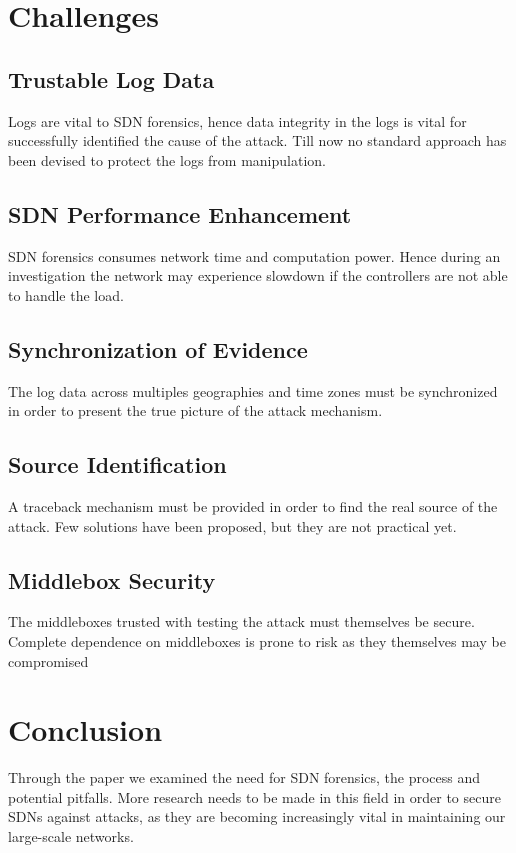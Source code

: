 \documentclass{article}
\begin{document}
\section{Challenges}

\subsection{Trustable Log Data}

Logs are vital to SDN forensics, hence data integrity in the logs is vital for successfully identified the cause of the attack. Till now no standard approach has been devised to protect the logs from manipulation.

\subsection{SDN Performance Enhancement}

SDN forensics consumes network time and computation power. Hence during an investigation the network may experience slowdown if the controllers are not able to handle the load.

\subsection{Synchronization of Evidence}

The log data across multiples geographies and time zones must be synchronized in order to present the true picture of the attack mechanism.

\subsection{Source Identification}

A traceback mechanism must be provided in order to find the real source of the attack. Few solutions have been proposed, but they are not practical yet.

\subsection{Middlebox Security}

The middleboxes trusted with testing the attack must themselves be secure. Complete dependence on middleboxes is prone to risk as they themselves may be compromised

\section{Conclusion}

Through the paper we examined the need for SDN forensics, the process and potential pitfalls. More research needs to be made in this field in order to secure SDNs against attacks, as they are becoming increasingly vital in maintaining our large-scale networks.
\end{document}
